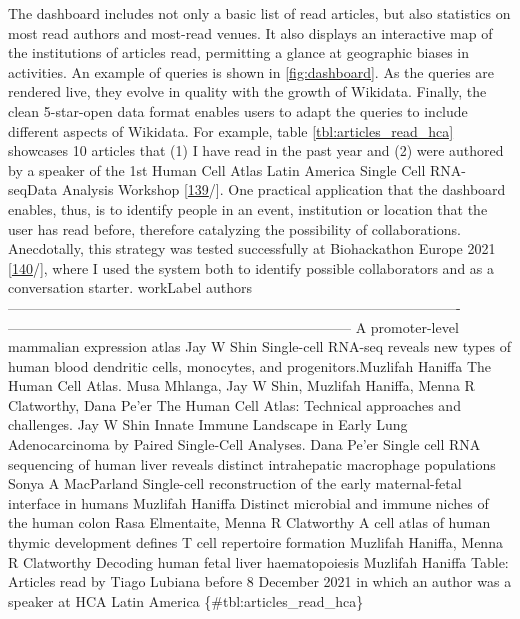 The dashboard includes not only a basic list of read articles, but also statistics on most read authors and most-read venues.
It also displays an interactive map of the institutions of articles read, permitting a glance at geographic biases in activities.
An example of queries is shown in \ref{fig:dashboard}.
As the queries are rendered live, they evolve in quality with the growth of Wikidata.
Finally, the clean 5-star-open data format enables users to adapt the queries to include different aspects of Wikidata.
For example, table \ref{tbl:articles_read_hca} showcases 10 articles that (1) I have read in the past year and (2) were authored by a speaker of the 1st Human Cell Atlas Latin America Single Cell RNA-seqData Analysis Workshop {[}\protect\hyperlink{ref-1hag8XE6}{139}/{]}.
One practical application that the dashboard enables, thus, is to identify people in an event, institution or location that the user has read before, therefore catalyzing the possibility of collaborations.
Anecdotally, this strategy was tested successfully at Biohackathon Europe 2021 {[}\protect\hyperlink{ref-kHL3NVxk}{140}/{]}, where I used the system both to identify possible collaborators and as a conversation starter.
\textbar workLabel \textbar authors \textbar{}
\textbar-------------------------------------------------------------------------------------------------\textbar--------------------------------------------------------------------------\textbar{}
\textbar A promoter-level mammalian expression atlas \textbar Jay W Shin \textbar{}
\textbar Single-cell RNA-seq reveals new types of human blood dendritic cells, monocytes, and progenitors.\textbar Muzlifah Haniffa \textbar{}
\textbar The Human Cell Atlas. \textbar Musa Mhlanga, Jay W Shin, Muzlifah Haniffa, Menna R Clatworthy, Dana Pe'er\textbar{}
\textbar The Human Cell Atlas: Technical approaches and challenges. \textbar Jay W Shin \textbar{}
\textbar Innate Immune Landscape in Early Lung Adenocarcinoma by Paired Single-Cell Analyses. \textbar Dana Pe'er \textbar{}
\textbar Single cell RNA sequencing of human liver reveals distinct intrahepatic macrophage populations \textbar Sonya A MacParland \textbar{}
\textbar Single-cell reconstruction of the early maternal-fetal interface in humans \textbar Muzlifah Haniffa \textbar{}
\textbar Distinct microbial and immune niches of the human colon \textbar Rasa Elmentaite, Menna R Clatworthy \textbar{}
\textbar A cell atlas of human thymic development defines T cell repertoire formation \textbar Muzlifah Haniffa, Menna R Clatworthy \textbar{}
\textbar Decoding human fetal liver haematopoiesis \textbar Muzlifah Haniffa \textbar{}
Table: Articles read by Tiago Lubiana before 8 December 2021 in which an author was a speaker at HCA Latin America
\{\#tbl:articles\_read\_hca\} \textbar{}

